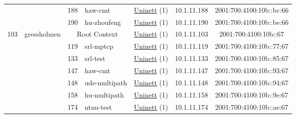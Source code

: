 \begin{small}
\begin{center}
\begin{longtable}{|c|c|c|c|c|c|c|c|}
  &  & \tiny{188} & \multicolumn{1}{|l|}{\tiny{haw-cmt}} & \multicolumn{2}{|c|}{\tiny{\href{https://www.uninett.no}{Uninett} (1)}} & \tiny{10.1.11.188} & \tiny{2001:700:4100:10b::bc:66} \\* \cline{3-3}\cline{4-4}\cline{5-5}\cline{6-6}\cline{7-7}\cline{8-8}
  &  & \tiny{190} & \multicolumn{1}{|l|}{\tiny{hu-zhoufeng}} & \multicolumn{2}{|c|}{\tiny{\href{https://www.uninett.no}{Uninett} (1)}} & \tiny{10.1.11.190} & \tiny{2001:700:4100:10b::be:66} \\ \hline
 \multirow{8}{*}{\tiny{103}} & \multicolumn{1}{|l|}{\multirow{8}{*}{\tiny{gressholmen}}} & \multicolumn{2}{|c|}{\tiny{Root Context}} & \multicolumn{2}{|c|}{\tiny{\href{https://www.uninett.no}{Uninett} (1)}} & \tiny{10.1.11.103} & \tiny{2001:700:4100:10b::67} \\* \cline{3-3}\cline{4-4}\cline{5-5}\cline{6-6}\cline{7-7}\cline{8-8}
  &  & \tiny{119} & \multicolumn{1}{|l|}{\tiny{srl-mptcp}} & \multicolumn{2}{|c|}{\tiny{\href{https://www.uninett.no}{Uninett} (1)}} & \tiny{10.1.11.119} & \tiny{2001:700:4100:10b::77:67} \\* \cline{3-3}\cline{4-4}\cline{5-5}\cline{6-6}\cline{7-7}\cline{8-8}
  &  & \tiny{133} & \multicolumn{1}{|l|}{\tiny{srl-test}} & \multicolumn{2}{|c|}{\tiny{\href{https://www.uninett.no}{Uninett} (1)}} & \tiny{10.1.11.133} & \tiny{2001:700:4100:10b::85:67} \\* \cline{3-3}\cline{4-4}\cline{5-5}\cline{6-6}\cline{7-7}\cline{8-8}
  &  & \tiny{147} & \multicolumn{1}{|l|}{\tiny{haw-cmt}} & \multicolumn{2}{|c|}{\tiny{\href{https://www.uninett.no}{Uninett} (1)}} & \tiny{10.1.11.147} & \tiny{2001:700:4100:10b::93:67} \\* \cline{3-3}\cline{4-4}\cline{5-5}\cline{6-6}\cline{7-7}\cline{8-8}
  &  & \tiny{148} & \multicolumn{1}{|l|}{\tiny{ude-multipath}} & \multicolumn{2}{|c|}{\tiny{\href{https://www.uninett.no}{Uninett} (1)}} & \tiny{10.1.11.148} & \tiny{2001:700:4100:10b::94:67} \\* \cline{3-3}\cline{4-4}\cline{5-5}\cline{6-6}\cline{7-7}\cline{8-8}
  &  & \tiny{158} & \multicolumn{1}{|l|}{\tiny{hu-multipath}} & \multicolumn{2}{|c|}{\tiny{\href{https://www.uninett.no}{Uninett} (1)}} & \tiny{10.1.11.158} & \tiny{2001:700:4100:10b::9e:67} \\* \cline{3-3}\cline{4-4}\cline{5-5}\cline{6-6}\cline{7-7}\cline{8-8}
  &  & \tiny{174} & \multicolumn{1}{|l|}{\tiny{ntnu-test}} & \multicolumn{2}{|c|}{\tiny{\href{https://www.uninett.no}{Uninett} (1)}} & \tiny{10.1.11.174} & \tiny{2001:700:4100:10b::ae:67} \\* \cline{3-3}\cline{4-4}\cline{5-5}\cline{6-6}\cline{7-7}\cline{8-8}

\end{longtable}
\end{center}
\end{small}
